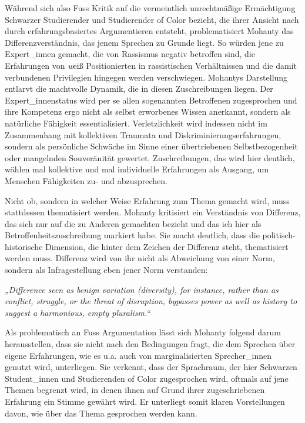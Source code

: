 Während sich also Fuss Kritik auf die vermeintlich unrechtmäßige Ermächtigung
Schwarzer Studierender und Studierender of Color bezieht, die ihrer Ansicht
nach durch erfahrungsbasiertes Argumentieren entsteht, problematisiert Mohanty
das Differenzverständnis, das jenem Sprechen zu Grunde liegt. So würden jene zu
Expert\_innen gemacht, die von Rassismus negativ betroffen sind, die Erfahrungen
von \textit{w}eiß Positionierten in rassistischen Verhältnissen und die damit
verbundenen Privilegien hingegen werden verschwiegen. Mohantys Darstellung
entlarvt die machtvolle Dynamik, die in diesen Zuschreibungen liegen. Der
Expert\_innenstatus wird per se allen sogenannten Betroffenen zugesprochen und
ihre Kompetenz ergo nicht als selbst erworbenes Wissen anerkannt, sondern als
natürliche Fähigkeit essentialisiert. Verletzlichkeit wird indessen nicht im
Zusammenhang mit kollektiven Traumata und Diskriminierungserfahrungen, sondern
als persönliche Schwäche im Sinne einer übertriebenen Selbstbezogenheit oder
mangelnden Souveränität gewertet. Zuschreibungen, das wird hier deutlich,
wählen mal kollektive und mal individuelle Erfahrungen als Ausgang, um Menschen
Fähigkeiten zu- und abzusprechen. 

Nicht ob, sondern in welcher Weise Erfahrung zum Thema gemacht wird, muss
stattdessen thematisiert werden. Mohanty kritisiert ein Verständnis von
Differenz, das sich nur auf die zu Anderen gemachten bezieht und das ich hier
als Betroffenheitszuschreibung markiert habe. Sie macht deutlich, dass die
politisch-historische Dimension, die hinter dem Zeichen der Differenz steht,
thematisiert werden muss.  Differenz wird von ihr nicht als Abweichung von
einer Norm, sondern als Infragestellung eben jener Norm verstanden:

\begin{myenv}
  \textit{„Difference seen as benign variation (diversity), for instance,
  rather than as conflict, struggle, or the threat of disruption, bypasses
power as well as history to suggest a harmonious, empty
pluralism.“\footnotemark{}}
\end{myenv}

Als problematisch an Fuss Argumentation lässt sich Mohanty folgend darum
herausstellen, dass sie nicht nach den Bedingungen fragt, die dem Sprechen über
eigene Erfahrungen, wie es u.a. auch von marginalisierten Sprecher\_innen
genutzt wird, unterliegen. Sie verkennt, dass der Sprachraum, der hier
Schwarzen Student\_innen und Studierenden of Color zugesprochen wird, oftmals
auf jene Themen begrenzt wird, in denen ihnen auf Grund ihrer zugeschriebenen
Erfahrung ein Stimme gewährt wird. Er unterliegt somit klaren Vorstellungen
davon, wie über das Thema gesprochen werden kann. 


